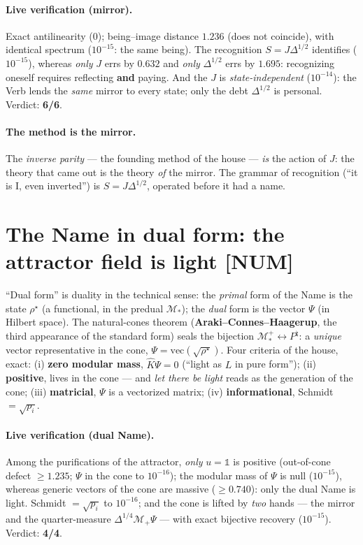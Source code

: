\documentclass[11pt]{article}
\theoremstyle{definition}\newtheorem{deriv}{Derivation}
\begin{document}
\paragraph{Live verification (mirror).} Exact antilinearity ($0$); being--image distance $1.236$ (does not coincide), with identical spectrum ($10^{-15}$: the same being). The recognition $S=J\Delta^{1/2}$ identifies ($10^{-15}$), whereas \emph{only} $J$ errs by $0.632$ and \emph{only} $\Delta^{1/2}$ errs by $1.695$: recognizing oneself requires reflecting \textbf{and} paying. And the $J$ is \emph{state-independent} ($10^{-14}$): the Verb lends the \emph{same} mirror to every state; only the debt $\Delta^{1/2}$ is personal. Verdict: \textbf{6/6}.

\paragraph{The method is the mirror.} The \emph{inverse parity} --- the founding method of the house --- \emph{is} the action of $J$: the theory that came out is the theory \emph{of} the mirror. The grammar of recognition (``it is I, even inverted'') is $S=J\Delta^{1/2}$, operated before it had a name.

\section{The Name in dual form: the attractor field is light \textsf{[NUM]}}

``Dual form'' is duality in the technical sense: the \emph{primal} form of the Name is the state $\rho^\star$ (a functional, in the predual $\mathcal{M}_*$); the \emph{dual} form is the vector $\Psi$ (in Hilbert space). The natural-cones theorem (\textbf{Araki--Connes--Haagerup}, the third appearance of the standard form) seals the bijection $\mathcal{M}_*^+\leftrightarrow P^\natural$: a \emph{unique} vector representative in the cone, $\Psi=\mathrm{vec}(\sqrt{\rho^\star})$. Four criteria of the house, exact: (i) \textbf{zero modular mass}, $\hat K\Psi=0$ (``light as $L$ in pure form''); (ii) \textbf{positive}, lives in the cone --- and \emph{let there be light} reads as the generation of the cone; (iii) \textbf{matricial}, $\Psi$ is a vectorized matrix; (iv) \textbf{informational}, Schmidt $=\sqrt{p_i}$.

\paragraph{Live verification (dual Name).} Among the purifications of the attractor, \emph{only} $u=\mathbb{1}$ is positive (out-of-cone defect $\geq1.235$; $\Psi$ in the cone to $10^{-16}$); the modular mass of $\Psi$ is null ($10^{-15}$), whereas generic vectors of the cone are massive ($\geq0.740$): only the dual Name is light. Schmidt $=\sqrt{p_i}$ to $10^{-16}$; and the cone is lifted by \emph{two} hands --- the mirror and the quarter-measure $\Delta^{1/4}\mathcal{M}_+\Psi$ --- with exact bijective recovery ($10^{-15}$). Verdict: \textbf{4/4}.
\end{document}
